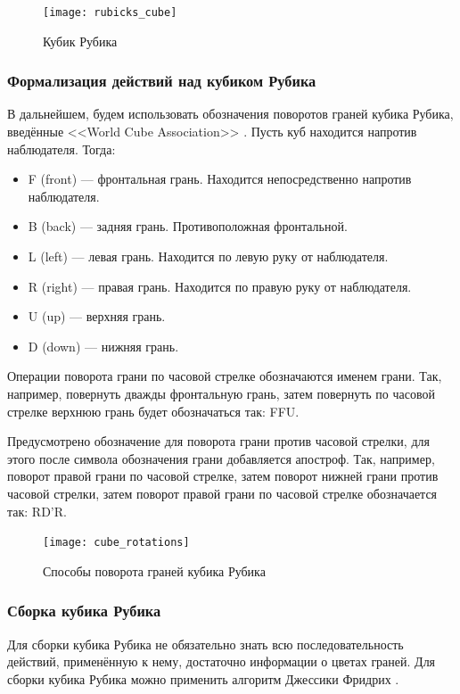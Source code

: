 \begin{figure}[ht]
	\centering
	\texttt{[image: rubicks\_cube]}
	\caption{Кубик Рубика}
	\label{fig:rubicks_cube}
\end{figure}

\subsubsection{Формализация действий над кубиком Рубика}
В дальнейшем, будем использовать обозначения поворотов граней кубика Рубика, введённые <<World Cube Association>> \cite{bib:cube_notation}. Пусть куб находится напротив наблюдателя. Тогда:

\begin{itemize}
	\item F (front) --- фронтальная грань. Находится непосредственно напротив наблюдателя.
	\item B (back) --- задняя грань. Противоположная фронтальной.
	\item L (left) --- левая грань. Находится по левую руку от наблюдателя.
	\item R (right) --- правая грань. Находится по правую руку от наблюдателя.
	\item U (up) --- верхняя грань.
	\item D (down) --- нижняя грань.
\end{itemize}

Операции поворота грани по часовой стрелке обозначаются именем грани. Так, например, повернуть дважды фронтальную грань, затем повернуть по часовой стрелке верхнюю грань будет обозначаться так: FFU.

Предусмотрено обозначение для поворота грани против часовой стрелки, для этого после символа обозначения грани добавляется апостроф. Так, например, поворот правой грани по часовой стрелке, затем поворот нижней грани против часовой стрелки, затем поворот правой грани по часовой стрелке обозначается так: RD’R.

\begin{figure}[ht]
	\centering
	\texttt{[image: cube\_rotations]}
	\caption{Способы поворота граней кубика Рубика}
	\label{fig:cube_rotations}
\end{figure}

\subsubsection{Сборка кубика Рубика}
Для сборки кубика Рубика не обязательно знать всю последовательность действий, применённую к нему, достаточно информации о цветах граней. Для сборки кубика Рубика можно применить алгоритм Джессики Фридрих \cite{bib:fridrich}.

